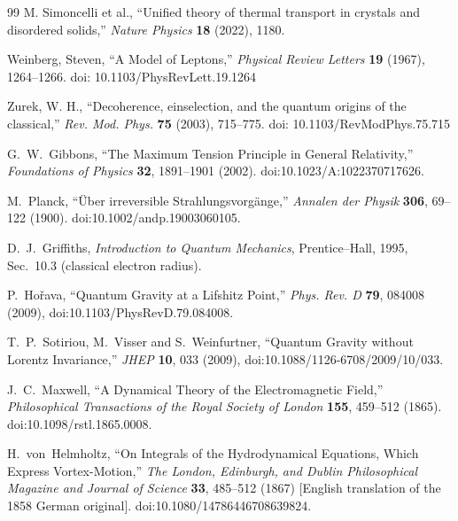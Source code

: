 \begin{thebibliography}{99}
    M. Simoncelli et al.,
    ``Unified theory of thermal transport in crystals and disordered solids,''
    \textit{Nature Physics}
    \textbf{18}
    (2022), 1180.

    Weinberg, Steven,
    ``A Model of Leptons,''
    \textit{Physical Review Letters}
    \textbf{19}
    (1967), 1264--1266.
    doi: 10.1103/PhysRevLett.19.1264

    Zurek, W. H.,
    ``Decoherence, einselection, and the quantum origins of the classical,''
    \textit{Rev. Mod. Phys.}
    \textbf{75}
    (2003), 715--775.
    doi: 10.1103/RevModPhys.75.715

    G.~W.~Gibbons,
    ``The Maximum Tension Principle in General Relativity,''
    \emph{Foundations of Physics} \textbf{32}, 1891--1901 (2002).
    doi:10.1023/A:1022370717626.

    M.~Planck,
    ``\"Uber irreversible Strahlungsvorg\"ange,''
    \emph{Annalen der Physik} \textbf{306}, 69--122 (1900).
    doi:10.1002/andp.19003060105.

    D.~J.~Griffiths,
    \emph{Introduction to Quantum Mechanics},
    Prentice--Hall, 1995, Sec.~10.3 (classical electron radius).

    P.~Hořava,
    ``Quantum Gravity at a Lifshitz Point,''
    \emph{Phys. Rev. D} \textbf{79}, 084008 (2009),
    doi:10.1103/PhysRevD.79.084008.

    T.~P.~Sotiriou, M.~Visser and S.~Weinfurtner,
    ``Quantum Gravity without Lorentz Invariance,''
    \emph{JHEP} \textbf{10}, 033 (2009),
    doi:10.1088/1126-6708/2009/10/033.

        J.~C.~Maxwell,
        ``A Dynamical Theory of the Electromagnetic Field,''
        \textit{Philosophical Transactions of the Royal Society of London} \textbf{155}, 459--512 (1865).
        doi:10.1098/rstl.1865.0008.

        H.~von~Helmholtz,
        ``On Integrals of the Hydrodynamical Equations, Which Express Vortex-Motion,''
        \textit{The London, Edinburgh, and Dublin Philosophical Magazine and Journal of Science} \textbf{33}, 485--512 (1867)
        [English translation of the 1858 German original].
        doi:10.1080/14786446708639824.


\end{thebibliography}
